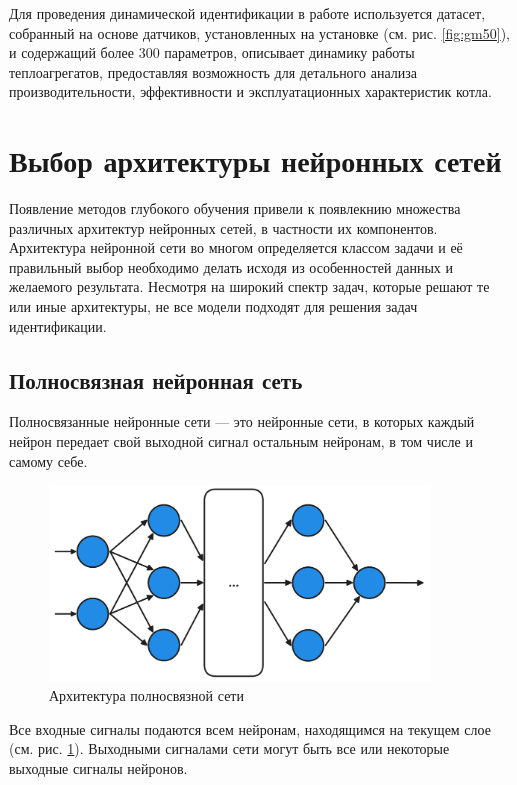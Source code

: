 Для проведения динамической идентификации в работе используется датасет, собранный на основе датчиков, установленных на установке (см. рис. \ref{fig:gm50}), и содержащий более 300 параметров, описывает динамику работы теплоагрегатов, предоставляя возможность для детального анализа производительности, эффективности и эксплуатационных характеристик котла.

\section{Выбор архитектуры нейронных сетей}

Появление методов глубокого обучения привели к появлекнию множества различных архитектур нейронных сетей, в частности их компонентов. Архитектура нейронной сети во многом определяется классом задачи и её правильный выбор необходимо делать исходя из особенностей данных и желаемого результата. Несмотря на широкий спектр задач, которые решают те или иные архитектуры, не все модели подходят для решения задач идентификации.

\subsection{Полносвязная нейронная сеть}

Полносвязанные нейронные сети — это нейронные сети, в которых каждый 
нейрон передает свой выходной сигнал остальным нейронам, в том числе 
и самому себе. 

\begin{figure}[H]
  \centering
    \includegraphics[width=0.9\textwidth]{figures/arch_fully_connected.png}
  \caption{Архитектура полносвязной сети}\label{fig:dense_nn}
\end{figure}

Все входные сигналы подаются всем нейронам, находящимся 
на текущем слое (см. рис. \ref{fig:dense_nn}). Выходными сигналами сети могут быть все или некоторые
выходные сигналы нейронов.

